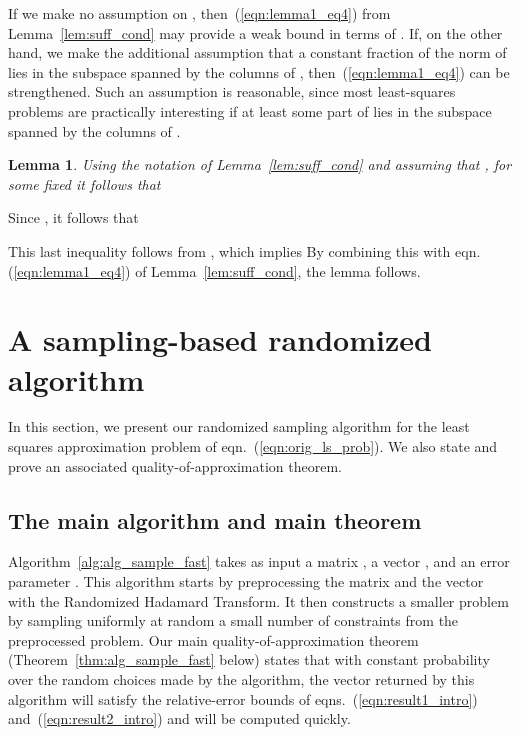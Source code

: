 \documentclass[11pt]{article}
\newtheorem{lemma}{Lemma}
\newenvironment{Proof}{\noindent {\em Proof:}}{\\\hspace*{\fill}\mbox{}}
\begin{document}
\noindent If we make no assumption on , then~(\ref{eqn:lemma1_eq4}) from
Lemma~\ref{lem:suff_cond} may provide a weak bound in terms of
. If, on the other hand, we make the additional
assumption that a constant fraction of the norm of  lies in
the subspace spanned by the columns of ,
then~(\ref{eqn:lemma1_eq4}) can be strengthened.
Such an assumption is reasonable, since most least-squares problems are
practically interesting if at least some part of  lies in the subspace
spanned by the columns of .

\begin{lemma}
\label{lem:suff_cond2}
Using the notation of Lemma~\ref{lem:suff_cond} and assuming
that , for some fixed
 it follows that

\end{lemma}
\begin{Proof}
Since , it follows that

This last inequality follows from , which implies 
By combining this with eqn. (\ref{eqn:lemma1_eq4}) of
Lemma~\ref{lem:suff_cond}, the lemma follows.
\end{Proof}

\section{A sampling-based randomized algorithm} \label{sxn:sampling}

In this section, we present our randomized sampling algorithm for the least squares approximation problem of eqn.~(\ref{eqn:orig_ls_prob}). We also state and prove an associated quality-of-approximation theorem.

\subsection{The main algorithm and main theorem} \label{sxn:sampling:result}

Algorithm~\ref{alg:alg_sample_fast} takes as input a matrix , a vector , and an error parameter . This algorithm starts by preprocessing the matrix  and the vector  with the Randomized Hadamard Transform. It then constructs a smaller problem by sampling uniformly at random a small number of constraints from the preprocessed problem. Our main quality-of-approximation theorem (Theorem~\ref{thm:alg_sample_fast} below) states that with constant probability over the random choices made by the algorithm, the vector
 returned by this algorithm will satisfy the relative-error bounds of eqns.~(\ref{eqn:result1_intro}) and~(\ref{eqn:result2_intro}) and will be computed quickly.
\end{document}
